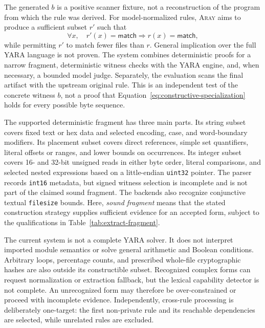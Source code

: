 \documentclass[11pt,twocolumn]{article}
\newcommand{\tool}{\textsc{Aray}\xspace}
\newcommand{\code}[1]{\texttt{#1}}
\begin{document}
The generated $b$ is a positive scanner fixture, not a reconstruction of the
program from which the rule was derived. For model-normalized rules, \tool aims
to produce a sufficient subset $r'$ such that
\begin{equation}
  \label{eq:constructive-specialization}
  \forall x,\quad r'(x)=\mathsf{match}\Rightarrow r(x)=\mathsf{match},
\end{equation}
while permitting $r'$ to match fewer files than $r$. General implication over
the full YARA language is not proven. The system combines deterministic proofs
for a narrow fragment, deterministic witness checks with the YARA engine, and,
when necessary, a bounded model judge. Separately, the evaluation scans the final
artifact with the upstream original rule. This is an independent test of the
concrete witness $b$, not a proof that Equation~\ref{eq:constructive-specialization}
holds for every possible byte sequence.

The supported deterministic fragment has three main parts. Its string subset
covers fixed text or hex data and selected encoding, case, and word-boundary
modifiers. Its placement subset covers direct references, simple set
quantifiers, literal offsets or ranges, and lower bounds on occurrences. Its
integer subset covers 16- and 32-bit unsigned reads in either byte order,
literal comparisons, and selected nested expressions based on a little-endian
\code{uint32} pointer. The parser records \code{int16} metadata, but signed
witness selection is incomplete and is not part of the claimed sound fragment.
The backends also recognize conjunctive textual \code{filesize} bounds. Here,
\emph{sound fragment} means that the stated construction strategy supplies
sufficient evidence for an accepted form, subject to the qualifications in
Table~\ref{tab:extract-fragment}.

The current system is not a complete YARA solver. It does not interpret imported
module semantics or solve general arithmetic and Boolean conditions. Arbitrary
loops, percentage counts, and prescribed whole-file cryptographic hashes are
also outside its constructible subset. Recognized complex forms can request
normalization or extraction fallback, but the lexical capability detector is
not complete. An unrecognized form may therefore be over-constrained or proceed
with incomplete evidence. Independently, cross-rule processing is deliberately
one-target: the first non-private rule and its reachable dependencies are
selected, while unrelated rules are excluded.
\end{document}

